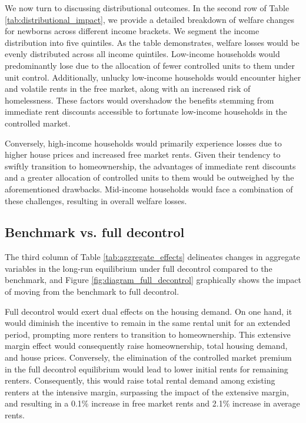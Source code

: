 \documentclass[parskip=full]{article}
\begin{document}
We now turn to discussing distributional outcomes. In the second row of Table \ref{tab:distributional_impact}, we provide a detailed breakdown of welfare changes for newborns across different income brackets. We segment the income distribution into five quintiles. As the table demonstrates, welfare losses would be evenly distributed across all income quintiles. Low-income households would predominantly lose due to the allocation of fewer controlled units to them under unit control. Additionally, unlucky low-income households would encounter higher and volatile rents in the free market, along with an increased risk of homelessness. These factors would overshadow the benefits stemming from immediate rent discounts accessible to fortunate low-income households in the controlled market. 

Conversely, high-income households would primarily experience losses due to higher house prices and increased free market rents. Given their tendency to swiftly transition to homeownership, the advantages of immediate rent discounts and a greater allocation of controlled units to them would be outweighed by the aforementioned drawbacks. Mid-income households would face a combination of these challenges, resulting in overall welfare losses.

\subsection{Benchmark vs. full decontrol}

The third column of Table \ref{tab:aggregate_effects} delineates changes in aggregate variables in the long-run equilibrium under full decontrol compared to the benchmark, and Figure \ref{fig:diagram_full_decontrol} graphically shows the impact of moving from the benchmark to full decontrol.

Full decontrol would exert dual effects on the housing demand. On one hand, it would diminish the incentive to remain in the same rental unit for an extended period, prompting more renters to transition to homeownership. This extensive margin effect would consequently raise homeownership, total housing demand, and house prices. Conversely, the elimination of the controlled market premium in the full decontrol equilibrium would lead to lower initial rents for remaining renters. Consequently, this would raise total rental demand among existing renters at the intensive margin, surpassing the impact of the extensive margin, and resulting in a 0.1\% increase in free market rents and 2.1\% increase in average rents. 
\end{document}
